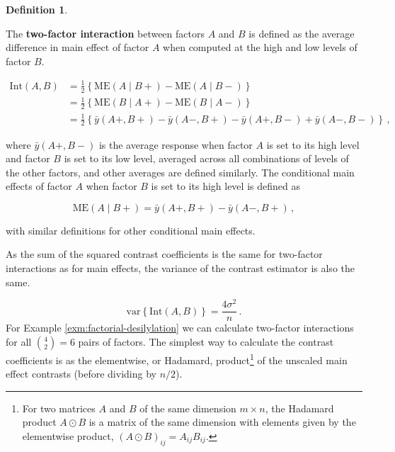 \documentclass[
]{book}
\theoremstyle{definition}
\newtheorem{definition}{Definition}[chapter]
\theoremstyle{definition}
\theoremstyle{definition}
\theoremstyle{definition}
\theoremstyle{remark}
\begin{document}
\begin{definition}
\protect\hypertarget{def:two-factor-interaction}{}\label{def:two-factor-interaction}

The \textbf{two-factor interaction} between factors \(A\) and \(B\) is defined as the average difference in main effect of factor \(A\) when computed at the high and low levels of factor \(B\).

\begin{align*}
\mbox{Int}(A, B) & = \frac{1}{2}\left\{\mbox{ME}(A\mid B+) - \mbox{ME}(A \mid B-)\right\} \\
& = \frac{1}{2}\left\{\mbox{ME}(B \mid A+) - \mbox{ME}(B \mid A-)\right\} \\
& = \frac{1}{2}\left\{\bar{y}(A+, B+) - \bar{y}(A-, B+) - \bar{y}(A+, B-) + \bar{y}(A-, B-)\right\}\,,
\end{align*}

where \(\bar{y}(A+, B-)\) is the average response when factor \(A\) is set to its high level and factor \(B\) is set to its low level, averaged across all combinations of levels of the other factors, and other averages are defined similarly. The conditional main effects of factor \(A\) when factor \(B\) is set to its high level is defined as

\[
\mbox{ME}(A\mid B+) = \bar{y}(A+, B+) - \bar{y}(A-, B+)\,,
\]

with similar definitions for other conditional main effects.

\end{definition}

As the sum of the squared contrast coefficients is the same for two-factor interactions as for main effects, the variance of the contrast estimator is also the same.

\[
\mbox{var}\left\{\mbox{Int}(A, B)\right\} = \frac{4\sigma^2}{n}\,.
\]
For Example \ref{exm:factorial-desilylation} we can calculate two-factor interactions for all \({4 \choose 2} = 6\) pairs of factors. The simplest way to calculate the contrast coefficients is as the elementwise, or Hadamard, product\footnote{For two matrices \(A\) and \(B\) of the same dimension \(m\times n\), the Hadamard product \(A\odot B\) is a matrix of the same dimension with elements given by the elementwise product, \((A\odot B)_{ij} = A_{ij}B_{ij}\).} of the unscaled main effect contrasts (before dividing by \(n/2\)).
\end{document}
